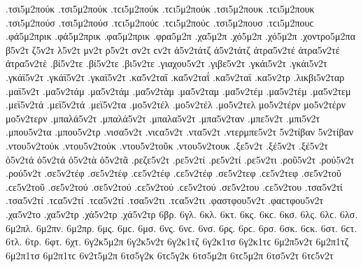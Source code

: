 {.τσι5μ2πούκ .τσι5μ2πούκ .τϲι5μ2πούκ .τϲι5μ2πούκ   %
.τσι5μ2πουκ .τϲι5μ2πουκ
.τσι5μ2πούσ .τσι5μ2πούσ .τϲι5μ2πούϲ .τϲι5μ2πούϲ   %
.τσι5μ2πουσ .τϲι5μ2πουϲ
.φά5μ2πρικ .φά5μ2πρικ   %
.φα5μ2πρικ
.φρα5μ2π   %
.χα5μ2π   %
.χό5μ2π .χό5μ2π   %
.χοντρο5μ2πα   %
β5ν2τ
ζ5ν2τ
λ5ν2τ
μν2τ
ρ5ν2τ
σν2τ ϲν2τ
ἀ5ν2τάτζ ἀ5ν2τάτζ   %
ἀτρα5ν2τέ ἀτρα5ν2τέ   %
ἀτρα5ν2τὲ
.βί5ν2τε .βί5ν2τε   %
.βι5ν2τε
.γιαχου5ν2τ   %
.γιβε5ν2τ   %
.γκάι5ν2τ .γκάι5ν2τ   %
.γκάϊ5ν2τ .γκάϊ5ν2τ
.γκαϊ5ν2τ
.κα5ν2ταΐ .κα5ν2ταΐ   %
.κα5ν2ταϊ
.κα5ν2τρ   %
.λικβι5ν2ταρ   %
.μαϊ5ν2τ   %
.μα5ν2τάμ .μα5ν2τάμ   %
.μα5ν2τὰμ
.μα5ν2ταμ
.μα5ν2τέμ .μα5ν2τέμ   %
.μα5ν2τεμ
.μεϊ5ν2τά .μεϊ5ν2τά   %
.μεϊ5ν2τα
.μο5ν2τέλ .μο5ν2τέλ   %
.μο5ν2τελ
μο5ν2τέρν μο5ν2τέρν   %
μο5ν2τερν
.μπαλά5ν2τ .μπαλά5ν2τ   %
.μπαλα5ν2τ
.μπα5ν2ταν   %
.μπε5ν2τ   %
.μπι5ν2τ   %
.μπου5ν2τα   %
.μπου5ν2τρ   %
.νισα5ν2τ .νιϲα5ν2τ   %
.ντα5ν2τ   %
.ντερμπε5ν2τ   %
5ν2τίβαν 5ν2τίβαν   %
.ντου5ν2τούκ .ντου5ν2τούκ   %
.ντου5ν2τοῦκ
.ντου5ν2τουκ
.ξε5ν2τ   %
.ξέ5ν2τ .ξέ5ν2τ
ὀ5ν2τά ὀ5ν2τά   %
ὀ5ν2τὰ
ὀ5ν2τᾶ
.ρεζε5ν2τ   %
.ρε5ν2τί .ρε5ν2τί   %
.ρε5ν2τι
.ροῦ5ν2τ   %
.ρού5ν2τ .ρού5ν2τ
.σε5ν2τέφ .σε5ν2τέφ .ϲε5ν2τέφ .ϲε5ν2τέφ   %
.σε5ν2τεφ .ϲε5ν2τεφ
.σε5ν2τοῦ .ϲε5ν2τοῦ   %
.σε5ν2τού .σε5ν2τού .ϲε5ν2τού .ϲε5ν2τού
.σε5ν2του .ϲε5ν2του
.τσα5ν2τί .τσα5ν2τί .τϲα5ν2τί .τϲα5ν2τί   %
.τσα5ν2τι .τϲα5ν2τι
.φαστφου5ν2τ .φαϲτφου5ν2τ   %
.χα5ν2το   %
.χα5ν2τρ   %
.χά5ν2τρ .χά5ν2τρ
6βρ.   %
6γλ.   %
6κλ.   %
6κτ.   %
6κς. 6κϲ.   %
6κσ.
6λς. 6λϲ.   %
6λσ.
6μ2πλ.   %
6μ2πν.   %
6μ2πρ.   %
6μς. 6μϲ.   %
6μσ.
6νς. 6νϲ.   %
6νσ.
6ρς. 6ρϲ.   %
6ρσ.
6σκ. 6ϲκ.   %
6στ. 6ϲτ.   %
6τλ.   %
6τρ.   %
6φτ.   %
6χτ.   %
6γ2κ5μ2π
6γ2κ5ν2τ
6γ2κ1τζ
6γ2κ1τσ 6γ2κ1τϲ
6μ2π5ν2τ
6μ2π1τζ
6μ2π1τσ 6μ2π1τϲ
6ν2τ5μ2π
6τσ5γ2κ 6τϲ5γ2κ
6τσ5μ2π 6τϲ5μ2π
6τσ5ν2τ 6τϲ5ν2τ
}
